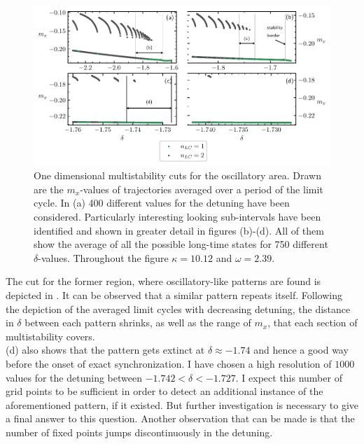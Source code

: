 \begin{figure}[H]
    \hspace*{-1.2cm}
    \includegraphics{pictures/multistab_line.pdf}
    \caption{One dimensional multistability cuts for the oscillatory area. Drawn are the $m_x$-values of trajectories averaged over a period of the limit cycle. In (a) 400 different values for the detuning have been considered. Particularly interesting looking sub-intervals have been identified and shown in greater detail in figures (b)-(d). All of them show the average of all the possible long-time states for 750 different $\delta$-values. Throughout the figure $\kappa=10.12$ and $\omega=2.39$.}
    \label{fig:osci_cut}
\end{figure}
The cut for the former region, where oscillatory-like patterns are found is depicted in . It can be observed that a similar pattern repeats itself. Following the depiction of the averaged limit cycles with decreasing detuning, the distance in $\delta$ between each pattern shrinks, as well as the range of $m_x$, that each section of multistability covers. \\(d) also shows that the pattern gets extinct at $\delta\approx-1.74$ and hence a good way before the onset of exact synchronization. I have chosen a high resolution of $1000$ values for the detuning between $-1.742<\delta<-1.727$. I expect this number of grid points to be sufficient in order to detect an additional instance of the aforementioned pattern, if it existed. But further investigation is necessary to give a final answer to this question. Another observation that can be made is that the number of fixed points jumps discontinuously in the detuning.\\\\
